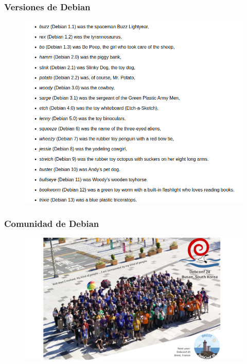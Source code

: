 \documentclass{beamer}
\begin{document}
\begin{frame}
  \frametitle{Versiones de Debian}
	\begin{figure}
		\centering
		\includegraphics[width=0.7\linewidth]{images/versions.png}
		\label{fig:versiones de Debian}
	\end{figure}
\end{frame}
\begin{frame}
  \frametitle{Comunidad de Debian}
	\begin{figure}
		\centering
		\includegraphics[width=0.7\linewidth]{images/debconf.png}
		\label{fig:comunidad de Debian}
	\end{figure}
\end{frame}
\end{document}
